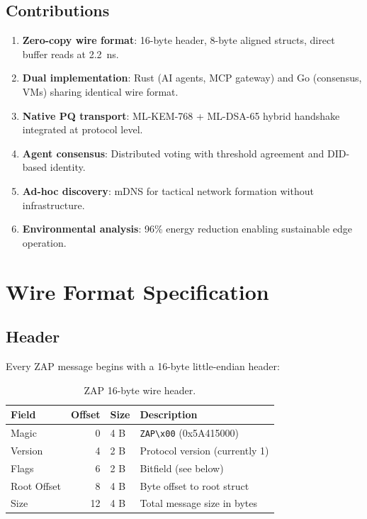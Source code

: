 \documentclass[11pt,letterpaper]{article}
\begin{document}
\subsection{Contributions}

\begin{enumerate}
\item \textbf{Zero-copy wire format}: 16-byte header, 8-byte aligned structs, direct buffer reads at 2.2~ns.
\item \textbf{Dual implementation}: Rust (AI agents, MCP gateway) and Go (consensus, VMs) sharing identical wire format.
\item \textbf{Native PQ transport}: ML-KEM-768 + ML-DSA-65 hybrid handshake integrated at protocol level.
\item \textbf{Agent consensus}: Distributed voting with threshold agreement and DID-based identity.
\item \textbf{Ad-hoc discovery}: mDNS for tactical network formation without infrastructure.
\item \textbf{Environmental analysis}: 96\% energy reduction enabling sustainable edge operation.
\end{enumerate}

\section{Wire Format Specification}

\subsection{Header}

Every ZAP message begins with a 16-byte little-endian header:

\begin{table}[H]
\centering
\begin{tabular}{@{}lrll@{}}
\toprule
\textbf{Field} & \textbf{Offset} & \textbf{Size} & \textbf{Description} \\
\midrule
Magic & 0 & 4 B & \texttt{ZAP\textbackslash x00} (0x5A415000) \\
Version & 4 & 2 B & Protocol version (currently 1) \\
Flags & 6 & 2 B & Bitfield (see below) \\
Root Offset & 8 & 4 B & Byte offset to root struct \\
Size & 12 & 4 B & Total message size in bytes \\
\bottomrule
\end{tabular}
\caption{ZAP 16-byte wire header.}
\label{tab:header}
\end{table}
\end{document}
